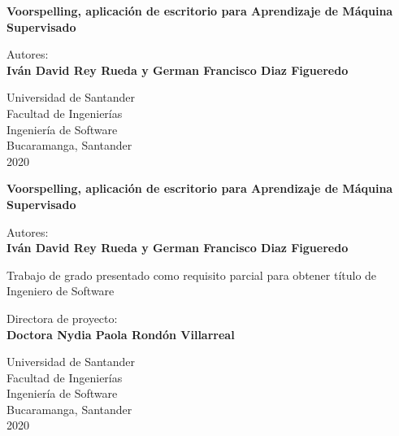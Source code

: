 
\begin{titlepage}
    \begin{center}
        \textbf{Voorspelling, aplicación de escritorio para Aprendizaje de Máquina Supervisado}
        
        \vfill
        
        Autores:\\
        \textbf{
        Iván David Rey Rueda y
        German Francisco Diaz Figueredo}
        
        \vfill
        
        Universidad de Santander\\
        Facultad de Ingenierías\\
        Ingeniería de Software\\
        Bucaramanga, Santander\\
        2020
    \end{center}
\thispagestyle{otherplain}   
\pagebreak
    
\begin{center}
        \textbf{Voorspelling, aplicación de escritorio para Aprendizaje de Máquina Supervisado}
        
        \vfill
        
        Autores:\\
        \textbf{
        Iván David Rey Rueda y German Francisco Diaz Figueredo}
        
        \vfill
        Trabajo de grado presentado como requisito parcial para obtener título de Ingeniero de Software
        
        \vfill
        
        Directora de proyecto:\\
        \textbf{Doctora Nydia Paola Rondón Villarreal}
        
        \vfill
        
        Universidad de Santander\\
        Facultad de Ingenierías\\
        Ingeniería de Software\\
        Bucaramanga, Santander\\
        2020
        
    \end{center}
\thispagestyle{otherplain}   
\end{titlepage}